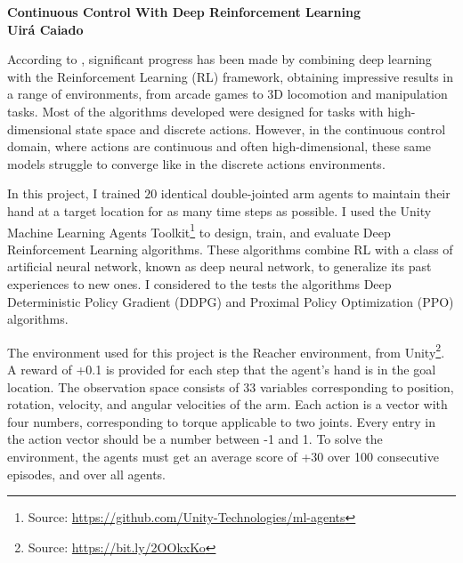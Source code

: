 \documentclass[a4paper]{article}
\begin{document}

\begin{center}

{\bf \large {Continuous Control With Deep Reinforcement Learning \\ \small Uirá Caiado}}
\end{center}




 According to  \cite{Duan:2016ur}, significant progress has been made by combining deep learning with the Reinforcement Learning (RL) framework, obtaining impressive results in a range of environments, from arcade games to 3D locomotion and manipulation tasks. Most of the algorithms developed were designed for tasks with high-dimensional state space and discrete actions. However, in the continuous control domain, where actions are continuous and often high-dimensional, these same models struggle to converge like in the discrete actions environments.
 
 In this project, I trained $20$ identical double-jointed arm agents to maintain their hand at a target location for as many time steps as possible. I used the Unity Machine Learning Agents Toolkit\footnote{Source: \url{https://github.com/Unity-Technologies/ml-agents}} to design, train, and evaluate Deep Reinforcement Learning algorithms. These algorithms combine RL with a class of artificial neural network, known as deep neural network, to generalize its past experiences to new ones. I considered to the tests the algorithms Deep Deterministic Policy Gradient (DDPG) and Proximal Policy Optimization (PPO) algorithms.
 
 The environment used for this project is the Reacher environment, from Unity\footnote{Source: \url{https://bit.ly/2OOkxKo}}. A reward of +0.1 is provided for each step that the agent's hand is in the goal location. The observation space consists of 33 variables corresponding to position, rotation, velocity, and angular velocities of the arm. Each action is a vector with four numbers, corresponding to torque applicable to two joints. Every entry in the action vector should be a number between -1 and 1. To solve the environment, the agents must get an average score of +30 over 100 consecutive episodes, and over all agents.
\end{document}
